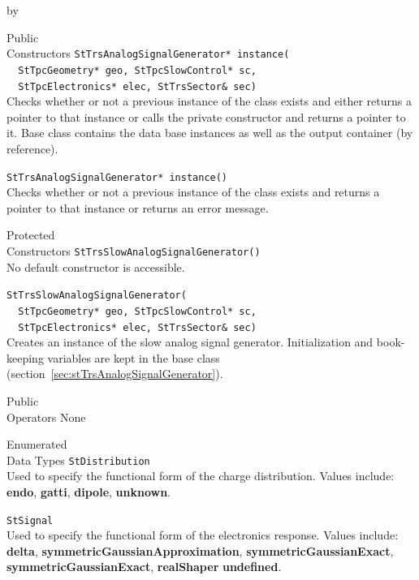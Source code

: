 \documentclass[twoside]{article}
\newcommand{\entrylabel}[1]{\mbox{\textbf{{#1}}}\hfil}%
\newenvironment{entry}
{\begin{list}{}%
    {\renewcommand{\makelabel}{\entrylabel}%
     \setlength{\labelwidth}{90pt}%
     \setlength{\leftmargin}{\labelwidth}
     \advance\leftmargin by \labelsep%
      }%
    }%
  {\end{list}}
\newcommand{\Entrylabel}[1]%
{\raisebox{0pt}[1ex][0pt]{\makebox[\labelwidth][l]%
    {\parbox[t]{\labelwidth}{\hspace{0pt}\textbf{{#1}}}}}}
\newenvironment{Entry}%
{\renewcommand{\entrylabel}{\Entrylabel}\begin{entry}}%
  {\end{entry}}
\begin{document}
\begin{Entry}
\item[Public \\ Constructors]
   \verb+StTrsAnalogSignalGenerator* instance(+\\
   \verb+  StTpcGeometry* geo, StTpcSlowControl* sc,+\\
   \verb+  StTpcElectronics* elec, StTrsSector& sec)+\\
   Checks whether or not a previous instance of the class exists and
   either returns a pointer to that instance or calls the private constructor
   and returns a pointer to it.  Base class contains the data base
   instances as well as the output container (by reference).

   \verb+StTrsAnalogSignalGenerator* instance()+\\
   Checks whether or not a previous instance of the class exists and
   returns a pointer to that instance or returns an error message.

\item[Protected \\ Constructors]
   \verb+StTrsSlowAnalogSignalGenerator()+\\
   No default constructor is accessible.

   \verb+StTrsSlowAnalogSignalGenerator(+\\
   \verb+  StTpcGeometry* geo, StTpcSlowControl* sc,+\\
   \verb+  StTpcElectronics* elec, StTrsSector& sec)+\\
   Creates an instance of the slow analog signal generator.  Initialization 
   and book-keeping variables are kept in the base class 
   (section~\ref{sec:stTrsAnalogSignalGenerator}).

\item[Public \\ Operators]
   None

\item[Enumerated \\ Data Types]
  \verb+StDistribution+\\
  Used to specify the functional form of the charge distribution.
  Values include: {\bf endo}, {\bf gatti}, {\bf dipole},
  {\bf unknown}.

  \verb+StSignal+\\
  Used to specify the functional form of the electronics
  response.  Values include: {\bf delta},
  {\bf symmetricGaussianApproximation},
  {\bf symmetricGaussianExact}, {\bf symmetricGaussianExact},
  {\bf realShaper} {\bf undefined}.
    

\end{Entry}
\end{document}
